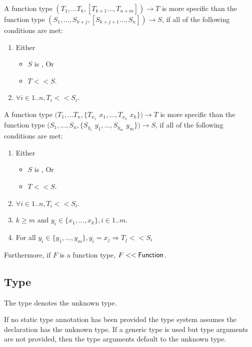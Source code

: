 \documentclass{article}
\newcommand{\code}[1]{{\sf #1}}
\begin{document}

\LMHash{}
A function type $(T_1, \ldots T_{k}, [T_{k+1}  \ldots, T_{n+m}]) \rightarrow T$ is more specific than the
function type $(S_1, \ldots, S_{k+j}, [S_{k+j+1} \ldots, S_{n}]) \rightarrow S$, if all of the following conditions are met:
\begin{enumerate}
\item Either
\begin{itemize}
\item $S$ is \VOID{}, Or
\item  $T << S$.
\end{itemize}
\item $\forall i \in 1 .. n, T_i << S_i$.
\end{enumerate}


\LMHash{}
A function type $(T_1, \ldots T_n, \{T_{x_1}$ $x_1, \ldots, T_{x_k}$ $x_k\}) \rightarrow T$ is more specific than the function type $(S_1, \ldots, S_n, \{S_{y_1}$ $y_1, \ldots, S_{y_m}$ $y_m\}) \rightarrow S$, if all of the following conditions are met:
\begin{enumerate}
\item Either
\begin{itemize}
\item $S$ is \VOID{}, Or
\item  $T  << S$.
\end{itemize}
\item $\forall i \in 1 .. n, T_i << S_i$.
\item $k \ge m$ and $y_i \in \{x_1,  \ldots, x_k\}, i \in 1 .. m$.
\item For all $y_i \in \{y_1,  \ldots, y_m\}, y_i = x_j \Rightarrow T_j << S_i$
\end{enumerate}

\LMHash{}
Furthermore, if $F$ is a function type, $F << \code{Function}$.


\subsection{Type \DYNAMIC{}}

\LMHash{}
The type  \DYNAMIC{}  denotes the unknown type.

\LMHash{}
If no static type annotation has been provided the type system assumes the declaration has the unknown type. If a generic type is used but type arguments are not provided, then the  type arguments default to the unknown type.
\end{document}
